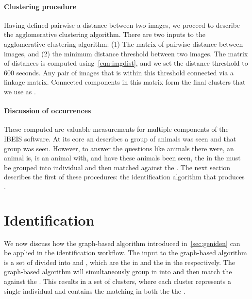     \paragraph{Clustering procedure}
    Having defined pairwise a distance between two images, we proceed to
      describe the agglomerative clustering algorithm.
    There are two inputs to the agglomerative clustering algorithm:
    (1) The matrix of pairwise distance between images, and
    (2) the minimum distance threshold between two images.
    The matrix of distances is computed using~\cref{eqn:imgdist}, and we set
      the distance threshold to $600$ seconds.
    Any pair of images that is within this threshold connected via a linkage
      matrix.
    Connected components in this matrix form the final clusters that we use as
      \occurrences{}.

    \paragraph{Discussion of occurrences}
    These computed \occurrences{} are valuable measurements for multiple
      components of the IBEIS software.
    At its core an \occurrence{} describes  a group of animals
      was seen and  that group was seen.
    However, to answer the questions like  animals there
      were,  an animal is,  is an animal with, and
       have these animals been seen, the \annots{} in the
      \occurrence{} must be grouped into individual \encounters{} and then
      matched against the \masterdatabase{}.
    The next section describes the first of these procedures:
    the \intraoccurrence{} identification algorithm that produces
      \encounters{}.

  \section{Identification}\label{sec:iden4}
    We now discuss how the graph-based algorithm introduced
      in~\cref{sec:geniden} can be applied in the identification workflow.
    The input to the graph-based algorithm is a set of \annots{} divided into
      \aan{\uset{}} and \aan{\lset{}}, which are the \annots{} in
      \aan{\occurrence{}} and the \exemplars{} in the \masterdatabase{}
      respectively.
    The graph-based algorithm will simultaneously group \annots{} in
      \aan{\occurrence{}} into \encounters{} and then match the \encounters{}
      against the \masterdatabase{}.
    This results in a set of clusters, where each cluster represents a single
      individual and contains the matching \annots{} in both the \encounter{}
      the \masterdatabase{}.

